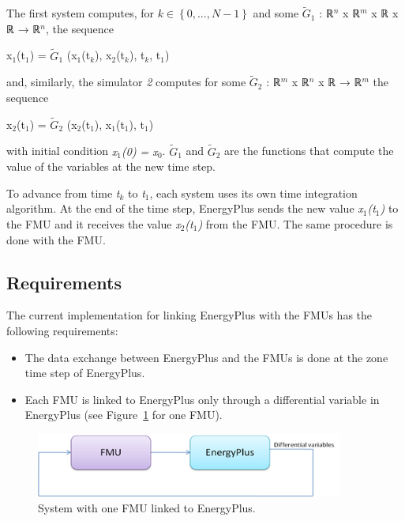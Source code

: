 The first system computes, for \(k\in\left\{0,...,N-1\right\}\) and some \(\tilde{G}_1\) : ℝ\(^{n}\) x ℝ\(^{m}\) x ℝ x ℝ → ℝ\(^{n}\), the sequence

x\(_{1}\)(t\(_{1}\)) = \(\tilde{G}_1\) (x\(_{1}\)(t\(_{k}\)), x\(_{2}\)(t\(_{k}\)), t\(_{k}\), t\(_{1}\))

and, similarly, the simulator \emph{2} computes for some \(\tilde{G}_2\) : ℝ\(^{m}\) x ℝ\(^{n}\) x ℝ → ℝ\(^{m}\) the sequence

x\(_{2}\)(t\(_{1}\)) = \(\tilde{G}_2\) (x\(_{2}\)(t\(_{1}\)), x\(_{1}\)(t\(_{1}\)), t\(_{1}\))

with initial condition \emph{x\(_{1}\)(0) = x\(_{0}\)}. \(\tilde{G}_1\) and \(\tilde{G}_2\) are the functions that compute the value of the variables at the new time step.

To advance from time \emph{t\(_{k}\)} to \emph{t\(_{1}\)}, each system uses its own time integration algorithm. At the end of the time step, EnergyPlus sends the new value \emph{x\(_{1}\)(t\(_{1}\))} to the FMU and it receives the value \emph{x\(_{2}\)(t\(_{1}\))} from the FMU. The same procedure is done with the FMU.

\subsection{Requirements}\label{requirements}

The current implementation for linking EnergyPlus with the FMUs has the following requirements:

\begin{itemize}
\item
  The data exchange between EnergyPlus and the FMUs is done at the zone time step of EnergyPlus.
\item
  Each FMU is linked to EnergyPlus only through a differential variable in EnergyPlus (see Figure~\ref{fig:system-with-one-fmu-linked-to-energyplus.-001} for one FMU).
\end{itemize}

\begin{figure}[hbtp] %
\centering
\includegraphics[width=0.9\textwidth, height=0.9\textheight, keepaspectratio=true]{media/image033.png}
\caption{System with one FMU linked to EnergyPlus. \protect \label{fig:system-with-one-fmu-linked-to-energyplus.-001}}
\end{figure}

